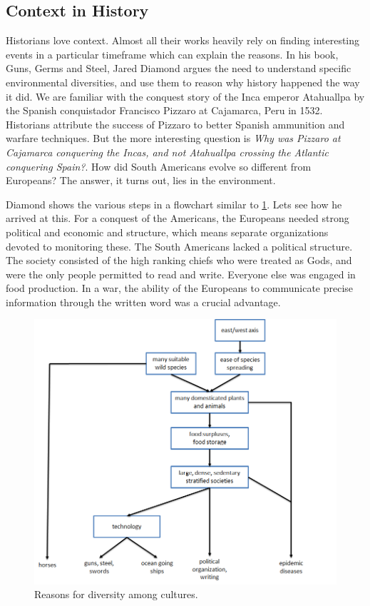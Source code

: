 \subsection{Context in History}
Historians love context. Almost all their works heavily rely on finding interesting events in a particular timeframe which can explain the reasons. In his book, Guns, Germs and Steel, Jared Diamond argues the need to understand specific environmental diversities, and use them to reason why history happened the way it did. We are familiar with the conquest story of the Inca emperor Atahuallpa by the Spanish conquistador Francisco Pizzaro at Cajamarca, Peru in 1532. Historians attribute the success of Pizzaro to better Spanish ammunition and warfare techniques. But the more interesting question is \textit{Why was Pizzaro at Cajamarca conquering the Incas, and not Atahuallpa crossing the Atlantic conquering Spain?}. How did South Americans evolve so different from Europeans? The answer, it turns out, lies in the environment.

Diamond shows the various steps in a flowchart similar to \ref{fig:axis-flowchart}. Lets see how he arrived at this. For a conquest of the Americans, the Europeans needed strong political and economic and  structure, which means separate organizations devoted to monitoring these. The South Americans lacked a political structure. The society consisted of the high ranking chiefs who were treated as Gods, and were the only people permitted to read and write. Everyone else was engaged in food production. In a war, the ability of the Europeans to communicate precise information through the written word was a crucial advantage.

\begin{figure}[t]
\centering
\includegraphics[width=\textwidth]{media/chapter2/axis.png}
\caption{Reasons for diversity among cultures.}
\label{fig:axis-flowchart}
\end{figure}

